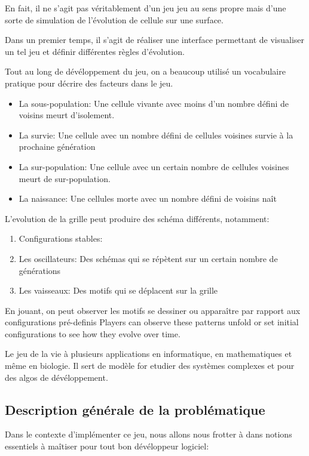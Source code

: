 En fait, il ne s'agit pas véritablement d'un jeu jeu au sens propre mais d'une sorte de simulation de l’évolution de cellule sur une surface. 

Dans un premier temps, il s'agit de réaliser une interface permettant de visualiser un tel jeu et définir différentes règles d’évolution.

Tout au long de dévéloppement du jeu, on a beaucoup utilisé un vocabulaire pratique pour décrire des facteurs dans le jeu.

\begin{itemize}
    \item La sous-population: Une cellule vivante avec moins d'un nombre défini de voisins meurt d'isolement.
    
    \item La survie: Une cellule avec un nombre défini de cellules voisines survie à la prochaine génération
    \item La sur-population: Une cellule avec un certain nombre de cellules voisines meurt de sur-population.
    \item La naissance: Une cellules morte avec un nombre défini de voisins naît 
\end{itemize}

L'evolution de la grille peut produire des schéma différents, notamment:
\begin{enumerate}
    \item Configurations stables:
    \item Les oscillateurs: Des schémas qui se répètent sur un certain nombre de générations
    \item Les vaisseaux: Des motifs qui se déplacent sur la grille
\end{enumerate}

En jouant, on peut observer les motifs se dessiner ou apparaître par rapport aux configurations pré-definis
Players can observe these patterns unfold or set initial configurations to see how they evolve over time.

Le jeu de la vie à plusieurs applications en informatique, en mathematiques et même en biologie. Il sert de modèle for etudier des systèmes complexes et pour des algos de dévéloppement.

\subsection{Description générale de la problématique}

Dans le contexte d'implémenter ce jeu, nous allons nous frotter à dans notions essentiels à maîtiser pour tout bon dévéloppeur logiciel:

